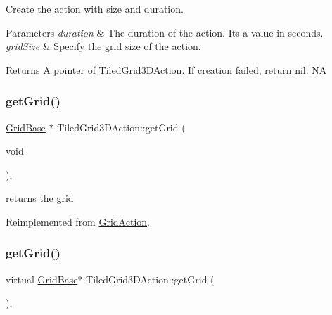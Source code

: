 Create the action with size and duration. 


\begin{DoxyParams}{Parameters}
{\em duration} & The duration of the action. It\textquotesingle{}s a value in seconds. \\
\hline
{\em grid\+Size} & Specify the grid size of the action. \\
\hline
\end{DoxyParams}
\begin{DoxyReturn}{Returns}
A pointer of \hyperlink{classTiledGrid3DAction}{Tiled\+Grid3\+D\+Action}. If creation failed, return nil.  NA 
\end{DoxyReturn}
\mbox{\label{classTiledGrid3DAction_a6481f8c3be55a8edc01527a7d62e9fce}} 
\subsubsection{\texorpdfstring{get\+Grid()}{getGrid()}\hspace{0.1cm}{\footnotesize\ttfamily [1/2]}}
{\footnotesize\ttfamily \hyperlink{classGridBase}{Grid\+Base} $\ast$ Tiled\+Grid3\+D\+Action\+::get\+Grid (\begin{DoxyParamCaption}\item[{void}]{ }\end{DoxyParamCaption})\hspace{0.3cm}{\ttfamily [override]}, {\ttfamily [virtual]}}

returns the grid 

Reimplemented from \hyperlink{classGridAction_abb96dc546ce69541bd233b7c2f240add}{Grid\+Action}.

\mbox{\label{classTiledGrid3DAction_a6a959d99477286fe1c467560638f1321}} 
\subsubsection{\texorpdfstring{get\+Grid()}{getGrid()}\hspace{0.1cm}{\footnotesize\ttfamily [2/2]}}
{\footnotesize\ttfamily virtual \hyperlink{classGridBase}{Grid\+Base}$\ast$ Tiled\+Grid3\+D\+Action\+::get\+Grid (\begin{DoxyParamCaption}{ }\end{DoxyParamCaption})\hspace{0.3cm}{\ttfamily [override]}, {\ttfamily [virtual]}}

